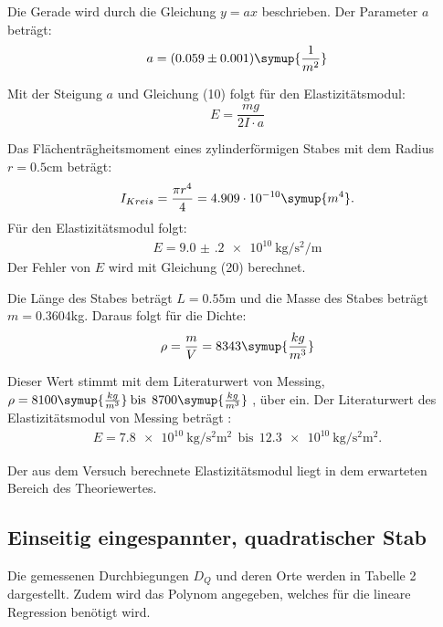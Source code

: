 Die Gerade wird durch die Gleichung $y = ax$ beschrieben. Der Parameter $a$ beträgt:
\begin{align*}
  a &= (0.059 \pm 0.001) \symup{\frac{1}{m^2}}\\
\end{align*}

Mit der Steigung $a$ und Gleichung (10) folgt für den Elastizitätsmodul:
\begin{equation}
  E = \frac{mg}{2I \cdot a}
\end{equation}

Das Flächenträgheitsmoment eines zylinderförmigen Stabes mit dem Radius
$r = 0.5$cm beträgt:
\begin{equation}
  I_{Kreis} = \frac{\pi r^4}{4} = 4.909 \cdot 10^{-10} \symup{m^4} .
\end{equation}
Für den Elastizitätsmodul folgt:
\begin{align*}
  E = \SI{9.0(2)e10}{\kilo\gram\per\second\squared\per\meter}
\end{align*}
Der Fehler von $E$ wird mit Gleichung (20) berechnet.

Die Länge des Stabes beträgt $L = 0.55$m und die Masse des Stabes beträgt $m = 0.3604$kg.
Daraus folgt für die Dichte:
\begin{equation}
  \rho = \frac{m}{V} = 8343 \symup{\frac{kg}{m^3}}
\end{equation}

Dieser Wert stimmt mit dem Literaturwert von Messing, $\rho =8100\symup{\frac{kg}{m^3}}\: \text{bis}\:\: 8700\symup{\frac{kg}{m^3}}$ \cite{sample2},
über ein.
Der Literaturwert des Elastizitätsmodul von Messing beträgt \cite{sample2}:
\begin{align*}
  E = \SI{7.8e10}{\kilo\gram\per\second\squared\square\meter} \:\: \text{bis} \:\:
  \SI{12.3e10}{\kilo\gram\per\second\squared\square\meter}.
\end{align*}

Der aus dem Versuch berechnete Elastizitätsmodul liegt in dem erwarteten Bereich des Theoriewertes.

\subsection{Einseitig eingespannter, quadratischer Stab}
Die gemessenen Durchbiegungen $D_Q$ und deren Orte werden in Tabelle 2 dargestellt. Zudem wird
das Polynom angegeben, welches für die lineare Regression benötigt wird.

